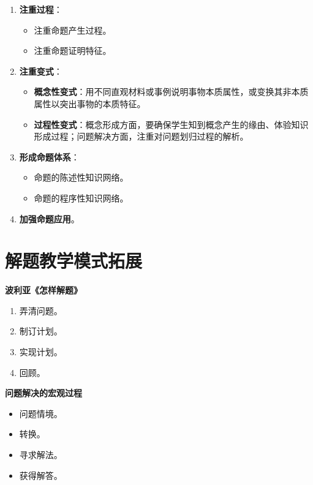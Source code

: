 \begin{enumerate}
    \item \textbf{注重过程}：
    \begin{itemize}
        \item 注重命题产生过程。
        \item 注重命题证明特征。
    \end{itemize}

    \item \textbf{注重变式}：
    \begin{itemize}
        \item \textbf{概念性变式}：用不同直观材料或事例说明事物本质属性，或变换其非本质属性以突出事物的本质特征。
        \item \textbf{过程性变式}：概念形成方面，要确保学生知到概念产生的缘由、体验知识形成过程；问题解决方面，注重对问题划归过程的解析。
    \end{itemize}

    \item \textbf{形成命题体系}：
    \begin{itemize}
        \item 命题的陈述性知识网络。
        \item 命题的程序性知识网络。
    \end{itemize}

    \item \textbf{加强命题应用}。
\end{enumerate}







\section{解题教学模式拓展}
\begin{multicols}{2}
\textbf{波利亚《怎样解题》}
\begin{enumerate}
    \item 弄清问题。
    \item 制订计划。
    \item 实现计划。
    \item 回顾。
\end{enumerate}

\columnbreak

\textbf{问题解决的宏观过程}
\begin{itemize}
    \item 问题情境。
    \item 转换。
    \item 寻求解法。
    \item 获得解答。
\end{itemize}
\end{multicols}




